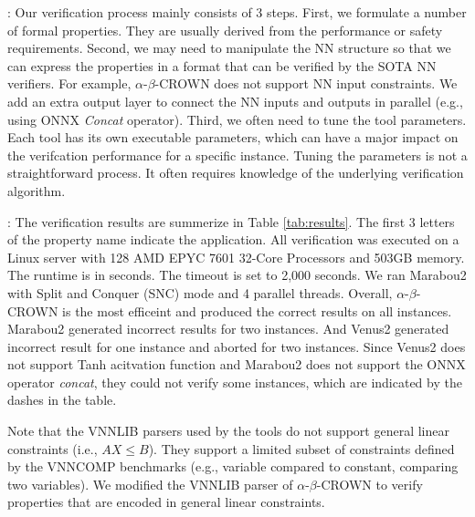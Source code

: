 : Our verification process mainly consists of 3 steps. First, we formulate a number of formal properties. They are usually derived from the performance or safety requirements. Second, we may need to manipulate the NN structure so that we can express the properties in a format that can be verified by the SOTA NN verifiers. For example, $\alpha$-$\beta$-CROWN does not support NN input constraints. We add an extra output layer to connect the NN inputs and outputs in parallel (e.g., using ONNX \emph{Concat} operator). Third, we often need to tune the tool parameters. Each tool has its own executable parameters, which can have a major impact on the verifcation performance for a specific instance. Tuning the parameters is not a straightforward process. It often requires knowledge of the underlying verification algorithm. 


: The verification results are summerize in Table \ref{tab:results}. The first 3 letters of the property name indicate the application. All verification was executed on a Linux server with 128 AMD EPYC 7601 32-Core Processors and 503GB memory. The runtime is in seconds. The timeout is set to 2,000 seconds. We ran Marabou2 with Split and Conquer (SNC) mode and 4 parallel threads. Overall, $\alpha$-$\beta$-CROWN is the most efficeint and produced the correct results on all instances. Marabou2 generated incorrect results for two instances. And Venus2 generated incorrect result for one instance and aborted for two instances. Since Venus2 does not support Tanh acitvation function and Marabou2 does not support the ONNX operator \emph{concat}, they could not verify some instances, which are indicated by the dashes in the table.

Note that the VNNLIB parsers used by the tools do not support general linear constraints (i.e., $AX\le B$). They support a limited subset of constraints defined by the VNNCOMP benchmarks (e.g., variable compared to constant, comparing two variables). We modified the VNNLIB parser of $\alpha$-$\beta$-CROWN to verify properties that are encoded in general linear constraints. 


